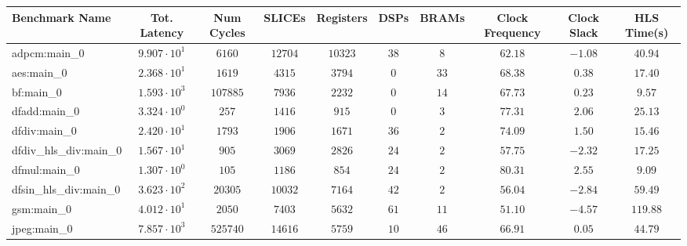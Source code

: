 \begin{tabular}{|l|c|c|c|c|c|c|c|c|c|}
\hline
Benchmark Name          & Tot. Latency           & Num Cycles & SLICEs    & Registers & DSPs    & BRAMs   & Clock Frequency & Clock Slack & HLS Time(s) \\
\hline
adpcm:main\_0           & $ 9.907 \cdot 10^{1} $ & $ 6160   $ & $ 12704 $ & $ 10323 $ & $ 38  $ & $ 8   $ & $ 62.18       $ & $ -1.08   $ & $ 40.94   $ \\
aes:main\_0             & $ 2.368 \cdot 10^{1} $ & $ 1619   $ & $ 4315  $ & $ 3794  $ & $ 0   $ & $ 33  $ & $ 68.38       $ & $ 0.38    $ & $ 17.40   $ \\
bf:main\_0              & $ 1.593 \cdot 10^{3} $ & $ 107885 $ & $ 7936  $ & $ 2232  $ & $ 0   $ & $ 14  $ & $ 67.73       $ & $ 0.23    $ & $ 9.57    $ \\
dfadd:main\_0           & $ 3.324 \cdot 10^{0} $ & $ 257    $ & $ 1416  $ & $ 915   $ & $ 0   $ & $ 3   $ & $ 77.31       $ & $ 2.06    $ & $ 25.13   $ \\
dfdiv:main\_0           & $ 2.420 \cdot 10^{1} $ & $ 1793   $ & $ 1906  $ & $ 1671  $ & $ 36  $ & $ 2   $ & $ 74.09       $ & $ 1.50    $ & $ 15.46   $ \\
dfdiv\_hls\_div:main\_0 & $ 1.567 \cdot 10^{1} $ & $ 905    $ & $ 3069  $ & $ 2826  $ & $ 24  $ & $ 2   $ & $ 57.75       $ & $ -2.32   $ & $ 17.25   $ \\
dfmul:main\_0           & $ 1.307 \cdot 10^{0} $ & $ 105    $ & $ 1186  $ & $ 854   $ & $ 24  $ & $ 2   $ & $ 80.31       $ & $ 2.55    $ & $ 9.09    $ \\
dfsin\_hls\_div:main\_0 & $ 3.623 \cdot 10^{2} $ & $ 20305  $ & $ 10032 $ & $ 7164  $ & $ 42  $ & $ 2   $ & $ 56.04       $ & $ -2.84   $ & $ 59.49   $ \\
gsm:main\_0             & $ 4.012 \cdot 10^{1} $ & $ 2050   $ & $ 7403  $ & $ 5632  $ & $ 61  $ & $ 11  $ & $ 51.10       $ & $ -4.57   $ & $ 119.88  $ \\
jpeg:main\_0            & $ 7.857 \cdot 10^{3} $ & $ 525740 $ & $ 14616 $ & $ 5759  $ & $ 10  $ & $ 46  $ & $ 66.91       $ & $ 0.05    $ & $ 44.79   $ \\

\end{tabular}
